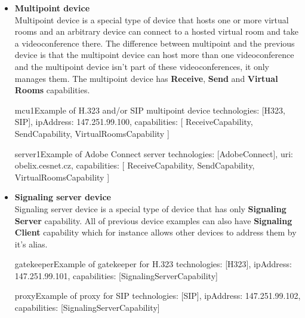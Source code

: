 \begin{itemize}
\begin{EntityExample}{}{terminal4}%
      {Example of terminal with one virtual room for H.323 and/or SIP}
technologies: [H323, SIP],
ipAddress: 147.251.99.4,
capabilities: [
  TerminalCapability,
  ReceiveCapability,
  SendCapability
  MixCapability
]
\end{EntityExample}

\item \textbf{Multipoint device} \\
  Multipoint device is a special type of device that hosts one or more virtual 
  rooms and an arbitrary device can connect to a hosted virtual room and take 
  a videoconference there. The difference between multipoint and the previous 
  device is that the multipoint device can host more than one videoconference 
  and the multipoint device isn't part of these videoconferences, it only 
  manages them. The multipoint device has \textbf{Receive}, \textbf{Send}
  and \textbf{Virtual Rooms} capabilities.

\begin{EntityExample}{}{mcu1}{Example of H.323 and/or SIP multipoint device}
technologies: [H323, SIP],
ipAddress: 147.251.99.100,
capabilities: [
  ReceiveCapability,
  SendCapability,
  VirtualRoomsCapability
]
\end{EntityExample}

\begin{EntityExample}{}{server1}{Example of Adobe Connect server}
technologies: [AdobeConnect],
uri: obelix.cesnet.cz,
capabilities: [
  ReceiveCapability,
  SendCapability,
  VirtualRoomsCapability
]
\end{EntityExample}

\item \textbf{Signaling server device} \\
  Signaling server device is a special type of device that has only 
  \textbf{Signaling Server} capability. All of previous device examples can 
  also have \textbf{Signaling Client} capability which for instance allows 
  other devices to address them by it's alias.
    
\begin{EntityExample}{}{gatekeeper}{Example of gatekeeper for H.323}
technologies: [H323],
ipAddress: 147.251.99.101,
capabilities: [SignalingServerCapability]
\end{EntityExample}

\begin{EntityExample}{}{proxy}{Example of proxy for SIP}
technologies: [SIP],
ipAddress: 147.251.99.102,
capabilities: [SignalingServerCapability]
\end{EntityExample}


\end{itemize}
